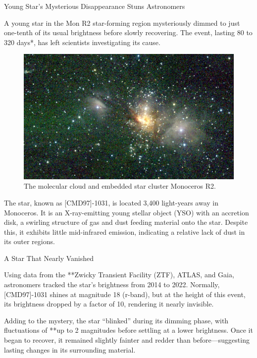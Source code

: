 \documentclass{tufte-handout}
\begin{document}
\clearpage

\begin{question}

\qpart

{\Large Young Star’s Mysterious Disappearance Stuns Astronomers}

A young star in the Mon R2 star-forming region mysteriously dimmed to just one-tenth of its usual 
brightness before slowly recovering. The event, lasting 80 to 320 days*, has left scientists 
investigating its cause.

\begin{figure}
\includegraphics[scale=0.5]{MONR2A.JPG}
\caption{The molecular cloud and embedded star cluster Monoceros R2.}
\end{figure} 

The star, known as [CMD97]-1031, is located 3,400 light-years away in Monoceros. 
It is an X-ray-emitting young stellar object (YSO) with an accretion disk, a 
swirling structure of gas and dust feeding material onto the star. Despite this, it exhibits 
little mid-infrared emission, indicating a relative lack of dust in its outer regions.

{\Large A Star That Nearly Vanished}

Using data from the **Zwicky Transient Facility (ZTF), ATLAS, and Gaia, astronomers tracked the 
star’s brightness from 2014 to 2022. Normally, [CMD97]-1031 shines at magnitude 18 (r-band),
 but at the height of this event, its brightness dropped by a factor of 10, rendering it nearly invisible.

Adding to the mystery, the star “blinked” during its dimming phase, with fluctuations of **up to 2 magnitudes
before settling at a lower brightness. Once it began to recover, it remained slightly fainter and redder
than before—suggesting lasting changes in its surrounding material.


\end{question}
\end{document}
